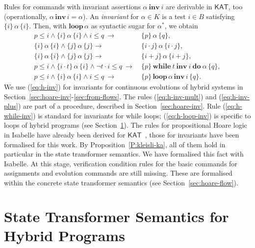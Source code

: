 \documentclass[envcountsame,envcountsect]{llncs}
\newcommand{\WHILEI}[3]{\mathbf{while}\ #1\ \mathbf{inv}\ #2\ \mathbf{do}\ #3}
\newcommand{\KAT}{\mathsf{KAT}}
\begin{document}
Rules for commands with invariant assertions $\alpha\ \mathbf{inv}\ i$
are derivable in $\KAT$, too (operationally,
$\alpha\, \mathbf{inv}\, i = \alpha$).  An \emph{invariant} for
$\alpha\in K$ is a test $i\in B$ satisfying $\{i\}\, \alpha\, \{i\}$.
Then, with $\mathbf{loop}\, \alpha$ as syntactic sugar for
$\alpha^\ast$, we obtain
\begin{align}
  p\le i \land \{i\}\, \alpha\, \{i\}\land i\le q\ \rightarrow\
  &\{p\}\, \alpha\, \{q\},\label{eq:h-inv}\tag{h-inv}\\
  \{i\}\, \alpha\, \{i\} \land \{j\}\, \alpha\, \{j\}\rightarrow\
  &\{i\cdot j\}\, \alpha\, \{i\cdot j\},\label{eq:h-inv-mult}\tag{h-inv-mult}\\
  \{i\}\, \alpha\, \{i\} \land \{j\}\, \alpha\, \{j\}\rightarrow\
  &\{i+ j\}\, \alpha\, \{i+ j\},\label{eq:h-inv-plus}\tag{h-inv-plus}\\
  p \le i \wedge \{i\cdot t\}\, \alpha\, \{i\} \wedge \neg t\cdot i\le q\
  \rightarrow \ & \{p\}\, \WHILEI{t}{i}{\alpha}\,  \{q\},\label{eq:h-while-inv}\tag{h-while-inv}\\
   p\le i \land \{i\}\, \alpha\, \{i\}\land i\le q\ \rightarrow\ &
                                                                   \{p\}\, \mathbf{loop}\, \alpha\,
    \mathbf{inv}\, i\, \{q\}. \label{eq:h-loop-inv}\tag{h-loop-inv}
\end{align}
We use (\ref{eq:h-inv}) for invariants for continuous evolutions of
hybrid systems in
Section~\ref{sec:hoare-inv}-\ref{sec:from-flows}. The rules
(\ref{eq:h-inv-mult}) and (\ref{eq:h-inv-plus}) are part of a
procedure, described in Section~\ref{sec:hoare-inv}. Rule
(\ref{eq:h-while-inv}) is standard for invariants for while loops;
(\ref{eq:h-loop-inv}) is specific to loops of hybrid programs (see
Section~\ref{sec:sta-hybrid}).  The rules for propositional Hoare
logic in Isabelle have already been derived for
$\KAT$~\cite{afp:kat,afp:vericomp}, those for invariants have been
formalised for this work. By Proposition~\ref{P:kleisli-ka}, all of
them hold in particular in the state transformer semantics. We have
formalised this fact with Isabelle. At this stage, verification
condition rules for the basic commands for assignments and evolution
commands are still missing. These are formalised within the concrete state
transformer semantics (see Section~\ref{sec:hoare-flow}).




\section{State Transformer Semantics for Hybrid
  Programs}\label{sec:sta-hybrid}
\end{document}
